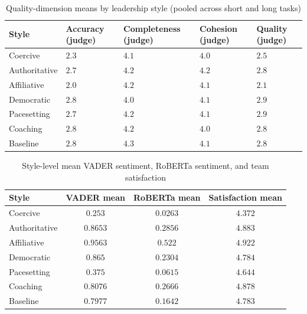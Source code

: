 \begin{table}[htbp]
  \centering
  \small
  \caption{Quality-dimension means by leadership style (pooled across short and long tasks)}
  \label{tab:03-quality-dimensions-by-style}
\begin{tabular}{l >{\centering\arraybackslash}p{2.15cm} >{\centering\arraybackslash}p{2.15cm} >{\centering\arraybackslash}p{2.15cm} >{\centering\arraybackslash}p{2.15cm}}
    \toprule
    Style & Accuracy (judge) & Completeness (judge) & Cohesion (judge) & Quality (judge) \\
    \midrule
    Coercive & $2.3$ & $4.1$ & $4.0$ & $2.5$ \\
    Authoritative & $2.7$ & $4.2$ & $4.2$ & $2.8$ \\
    Affiliative & $2.0$ & $4.2$ & $4.1$ & $2.1$ \\
    Democratic & $2.8$ & $4.0$ & $4.1$ & $2.9$ \\
    Pacesetting & $2.7$ & $4.2$ & $4.1$ & $2.9$ \\
    Coaching & $2.8$ & $4.2$ & $4.0$ & $2.8$ \\
    Baseline & $2.8$ & $4.3$ & $4.1$ & $2.8$ \\
    \bottomrule
\end{tabular}%
\end{table}

\begin{table}[htbp]
  \centering
  \small
  \caption{Style-level mean \ac{VADER} sentiment, \ac{RoBERTa} sentiment, and team satisfaction}
  \label{tab:03-sentiment-style-means}
\begin{tabular}{l c c c}
    \toprule
    Style & VADER mean & RoBERTa mean & Satisfaction mean \\
    \midrule
    Coercive & $0.253$ & $0.0263$ & $4.372$ \\
    Authoritative & $0.8653$ & $0.2856$ & $4.883$ \\
    Affiliative & $0.9563$ & $0.522$ & $4.922$ \\
    Democratic & $0.865$ & $0.2304$ & $4.784$ \\
    Pacesetting & $0.375$ & $0.0615$ & $4.644$ \\
    Coaching & $0.8076$ & $0.2666$ & $4.878$ \\
    Baseline & $0.7977$ & $0.1642$ & $4.783$ \\
    \bottomrule
\end{tabular}%
\end{table}

